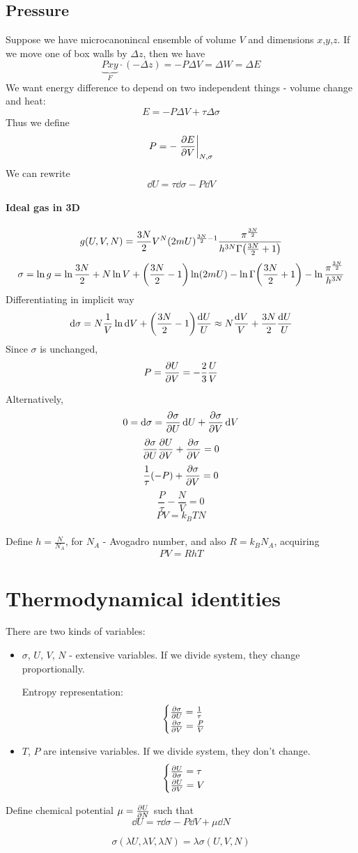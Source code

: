 \subsection{Pressure}
Suppose we have microcanonincal ensemble of volume $V$ and dimensions $x$,$y$,$z$. If we move one of box walls by $\Delta z$, then we have
$$\underbrace{Pxy}_{F} \cdot (-\Delta z )= -P \Delta V  =\Delta W = \Delta E$$
We want energy difference to depend on two independent things - volume change and heat:
$$E = -P\Delta V + \tau \Delta \sigma$$
Thus we define
$$ P = - \eval{\pdv{E}{V}}_{N, \sigma}$$ 
We can rewrite
$$\dd{U} = \tau\dd{\sigma} - P\dd{V}$$
\paragraph{Ideal gas in 3D}
$$g(U,V,N) = \frac{3N}{2} V^N (2mU)^{\frac{3N}{2}-1} \frac{\pi^{\frac{3N}{2}}}{h^{3N} \Gamma\qty(\frac{3N}{2}+1)} $$
$$\sigma = \ln g = \ln \frac{3N}{2} + N\ln V + \qty(\frac{3N}{2}-1)\ln (2mU) - \ln \Gamma\qty(\frac{3N}{2}+1) - \ln \frac{\pi^{\frac{3N}{2}}}{h^{3N}}$$
Differentiating in implicit way
$$\dd{\sigma} = N \frac{1}{V} \ln \dd{V} +  \qty(\frac{3N}{2}-1)\frac{\dd{U}}{U} \approx N\frac{\dd{V}}{V} + \frac{3N}{2}\frac{\dd{U}}{U}$$
Since $\sigma$ is unchanged,
$$P = \pdv{U}{V} = -\frac{2}{3}\frac{U}{V}$$


Alternatively,
$$0 =\dd{\sigma} = \pdv{\sigma}{U}\dd{U} + \pdv{\sigma}{V} \dd{V}$$
$$\pdv{\sigma}{U} \pdv{U}{V} + \pdv{\sigma}{V} = 0$$
$$\frac{1}{\tau} (-P) + \pdv{\sigma}{V} = 0$$
$$\frac{P}{\tau} - \frac{N}{V} = 0$$
$$PV = k_B TN$$

\paragraph{}
Define $h = \frac{N}{N_A}$, for $N_A$ - Avogadro number, and also $R  = k_B N_A$, acquiring
$$PV = RhT$$
\section{Thermodynamical identities}
There are two kinds of variables: 
\begin{itemize}
	\item $\sigma$, $U$, $V$, $N$ - extensive variables. If we divide system, they change proportionally.
	
	Entropy representation:
	$$\begin{cases}
	\pdv{\sigma}{U} = \frac{1}{\tau}\\
	\pdv{\sigma}{V} = \frac{P}{V}
	\end{cases}$$
	\item $T$, $P$ are intensive variables. If we divide system, they don't change.
	$$\begin{cases}
	\pdv{U}{\sigma} = \tau\\
	\pdv{U}{V} = V
	\end{cases}$$
\end{itemize}

Define chemical potential $\mu=\pdv{U}{N}$ such that
$$\dd{U} = \tau \dd{\sigma} - P \dd{V} + \mu\dd{N}$$


$$\sigma(\lambda U, \lambda V, \lambda N) = \lambda \sigma ( U,  V,  N) $$
